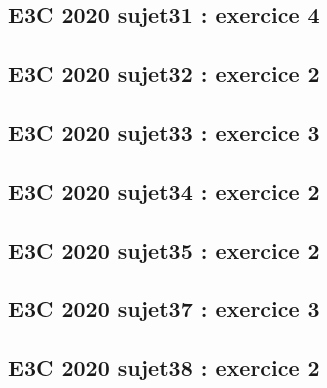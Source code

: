 \documentclass[lang=fr,edition=teacher,layout=sheet]{mxbook}
\begin{document}
\begingroup\endgroup
\par\bigskip
{}\subsection*{E3C 2020 sujet31 : exercice 4}
\begingroup\endgroup
\par\bigskip
{}\subsection*{E3C 2020 sujet32 : exercice 2}
\begingroup\endgroup
\par\bigskip
{}\subsection*{E3C 2020 sujet33 : exercice 3}
\begingroup\endgroup
\par\bigskip
{}\subsection*{E3C 2020 sujet34 : exercice 2}
\begingroup\endgroup
\par\bigskip
{}\subsection*{E3C 2020 sujet35 : exercice 2}
\begingroup\endgroup
\par\bigskip
{}\subsection*{E3C 2020 sujet37 : exercice 3}
\begingroup\endgroup
\par\bigskip
{}\subsection*{E3C 2020 sujet38 : exercice 2}
\begingroup\endgroup
\end{document}
